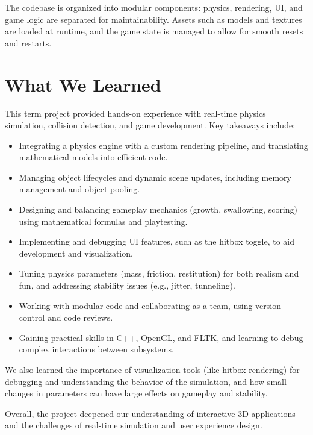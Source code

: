 \documentclass[a4paper, 10 pt]{article}
\begin{document}
The codebase is organized into modular components: physics, rendering, UI, and game logic are separated for maintainability. Assets such as models and textures are loaded at runtime, and the game state is managed to allow for smooth resets and restarts.

\section*{What We Learned}
This term project provided hands-on experience with real-time physics simulation, collision detection, and game development. Key takeaways include:
\begin{itemize}
  \item Integrating a physics engine with a custom rendering pipeline, and translating mathematical models into efficient code.
  \item Managing object lifecycles and dynamic scene updates, including memory management and object pooling.
  \item Designing and balancing gameplay mechanics (growth, swallowing, scoring) using mathematical formulas and playtesting.
  \item Implementing and debugging UI features, such as the hitbox toggle, to aid development and visualization.
  \item Tuning physics parameters (mass, friction, restitution) for both realism and fun, and addressing stability issues (e.g., jitter, tunneling).
  \item Working with modular code and collaborating as a team, using version control and code reviews.
  \item Gaining practical skills in C++, OpenGL, and FLTK, and learning to debug complex interactions between subsystems.
\end{itemize}

We also learned the importance of visualization tools (like hitbox rendering) for debugging and understanding the behavior of the simulation, and how small changes in parameters can have large effects on gameplay and stability.

Overall, the project deepened our understanding of interactive 3D applications and the challenges of real-time simulation and user experience design.
\end{document}
